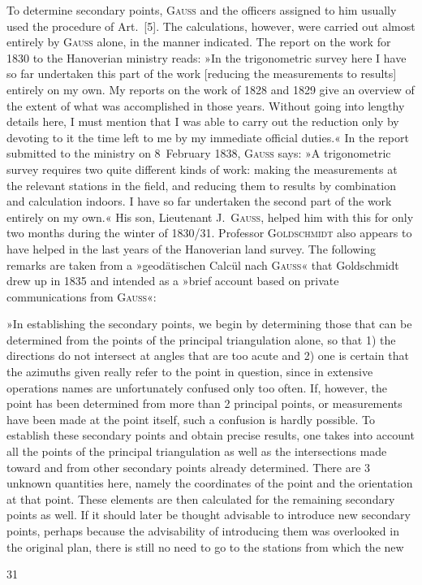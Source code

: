 To determine secondary points, \textsc{Gauss} and the officers assigned to him usually used the procedure of Art.~[5]. The calculations, however, were carried out almost entirely by \textsc{Gauss} alone, in the manner indicated. The report on the work for 1830 to the Hanoverian ministry reads: »In the trigonometric survey here I have so far undertaken this part of the work [reducing the measurements to results] entirely on my own. My reports on the work of 1828 and 1829 give an overview of the extent of what was accomplished in those years. Without going into lengthy details here, I must mention that I was able to carry out the reduction only by devoting to it  the time left to me by my immediate official duties.« In the report submitted to the ministry on 8~February 1838, \textsc{Gauss} says: »A trigonometric survey requires two quite different kinds of work: making the measurements at the relevant stations in the field, and reducing them to results by combination and calculation indoors. I have so far undertaken the second part of the work entirely on my own.« His son, Lieutenant J.~\textsc{Gauss}, helped him with this for only two months during the winter of 1830/31. Professor \textsc{Goldschmidt} also appears to have helped in the last years of the Hanoverian land survey. The following remarks are taken from a »geodätischen Calcül nach \textsc{Gauss}« that Goldschmidt drew up in 1835 and intended as a »brief account based on private communications from \textsc{Gauss}«:

»In establishing the secondary points, we begin by determining those that can be determined  from the points of the principal triangulation alone, so that 1) the directions do not intersect at angles that are too acute and 2) one is certain that the azimuths given really refer to the point in question, since in extensive operations names are unfortunately confused only too often. If, however, the point has been determined from more than 2 principal points, or measurements have been made at the point itself, such a confusion is hardly possible. To establish these secondary points and obtain precise results, one takes into account all the points of the principal triangulation as well as the intersections made toward and from other secondary points already determined. There are 3 unknown quantities here, namely the coordinates of the point and the orientation at that point. These elements are then calculated for the remaining secondary points as well. If it should later be thought advisable to introduce new secondary points, perhaps because the advisability of introducing them was overlooked in the original plan, there is still no need to go to the stations from which the new
\par\endgroup
\vfill{}\hfill31\hspace*{2cm}
\endgroup
